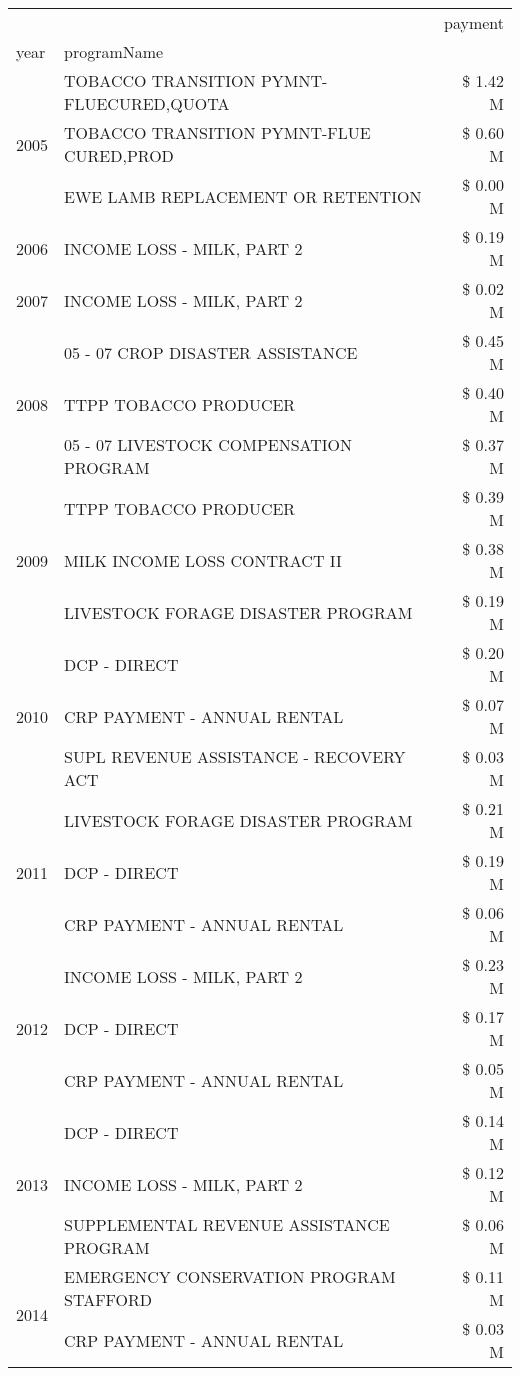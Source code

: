 \begin{tabular}{llr}
\toprule
 &  & payment \\
year & programName &  \\
\midrule
\multirow[t]{3}{*}{2005} & TOBACCO TRANSITION PYMNT-FLUECURED,QUOTA & \$ 1.42 M \\
 & TOBACCO TRANSITION PYMNT-FLUE CURED,PROD & \$ 0.60 M \\
 & EWE LAMB REPLACEMENT OR RETENTION & \$ 0.00 M \\
\cline{1-3}
2006 & INCOME LOSS - MILK, PART 2 & \$ 0.19 M \\
\cline{1-3}
2007 & INCOME LOSS - MILK, PART 2 & \$ 0.02 M \\
\cline{1-3}
\multirow[t]{3}{*}{2008} & 05 - 07 CROP DISASTER ASSISTANCE & \$ 0.45 M \\
 & TTPP TOBACCO PRODUCER & \$ 0.40 M \\
 & 05 - 07 LIVESTOCK COMPENSATION PROGRAM & \$ 0.37 M \\
\cline{1-3}
\multirow[t]{3}{*}{2009} & TTPP TOBACCO PRODUCER & \$ 0.39 M \\
 & MILK INCOME LOSS CONTRACT II & \$ 0.38 M \\
 & LIVESTOCK FORAGE DISASTER  PROGRAM & \$ 0.19 M \\
\cline{1-3}
\multirow[t]{3}{*}{2010} & DCP - DIRECT & \$ 0.20 M \\
 & CRP PAYMENT - ANNUAL RENTAL & \$ 0.07 M \\
 & SUPL REVENUE ASSISTANCE - RECOVERY ACT & \$ 0.03 M \\
\cline{1-3}
\multirow[t]{3}{*}{2011} & LIVESTOCK FORAGE DISASTER PROGRAM & \$ 0.21 M \\
 & DCP - DIRECT & \$ 0.19 M \\
 & CRP PAYMENT - ANNUAL RENTAL & \$ 0.06 M \\
\cline{1-3}
\multirow[t]{3}{*}{2012} & INCOME LOSS - MILK, PART 2 & \$ 0.23 M \\
 & DCP - DIRECT & \$ 0.17 M \\
 & CRP PAYMENT - ANNUAL RENTAL & \$ 0.05 M \\
\cline{1-3}
\multirow[t]{3}{*}{2013} & DCP - DIRECT & \$ 0.14 M \\
 & INCOME LOSS - MILK, PART 2 & \$ 0.12 M \\
 & SUPPLEMENTAL REVENUE ASSISTANCE PROGRAM & \$ 0.06 M \\
\cline{1-3}
\multirow[t]{3}{*}{2014} & EMERGENCY CONSERVATION PROGRAM STAFFORD & \$ 0.11 M \\
 & CRP PAYMENT - ANNUAL RENTAL & \$ 0.03 M \\

\end{tabular}
